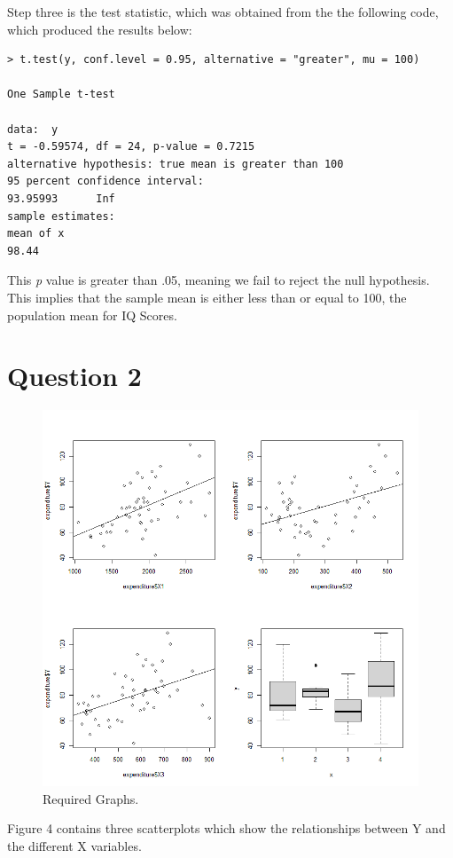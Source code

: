 \documentclass[12pt,letterpaper]{article}
\begin{document}
 
\vspace{.5cm}

\noindent Step three is the test statistic, which was obtained from the the following code, which produced the results below:

\begin{verbatim}
> t.test(y, conf.level = 0.95, alternative = "greater", mu = 100)

One Sample t-test

data:  y
t = -0.59574, df = 24, p-value = 0.7215
alternative hypothesis: true mean is greater than 100
95 percent confidence interval:
93.95993      Inf
sample estimates:
mean of x 
98.44 
\end{verbatim}

\noindent This \textit{p} value is greater than .05, meaning we fail to reject the null hypothesis. This implies that the sample mean is either less than or equal to 100, the population mean for IQ Scores.\\

\section*{Question 2}  

\begin{figure}[h!]\centering
	\caption{\footnotesize Required Graphs.}
	\label{fig:plots}
	\includegraphics[width=.75\textwidth]{Rplot01.png}
\end{figure}

\noindent Figure 4 contains three scatterplots which show the relationships between Y and the different X variables.\\
\end{document}
